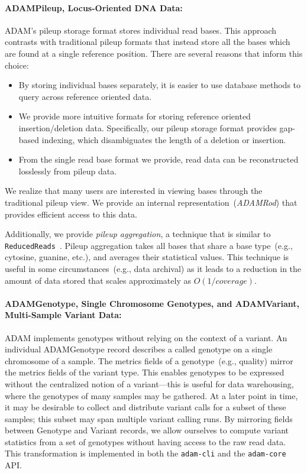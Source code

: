\documentclass{bioinfo}
\begin{document}
\paragraph{ADAMPileup, Locus-Oriented DNA Data:}
\label{sec:adampileup}

ADAM's pileup storage format stores individual read bases. This approach contrasts with traditional pileup formats that instead store all the bases which are found at a single
reference position. There are several reasons that inform this choice:

\begin{itemize}
\item By storing individual bases separately, it is easier to use database methods to query across reference oriented data.
\item We provide more intuitive formats for storing reference oriented insertion/deletion data. Specifically, our pileup storage format provides gap-based indexing, which
disambiguates the length of a deletion or insertion.
\item From the single read base format we provide, read data can be reconstructed losslessly from pileup data.
\end{itemize}

We realize that many users are interested in viewing bases through the traditional pileup view. We provide an internal representation~(\textit{ADAMRod}) that provides
efficient access to this data.

Additionally, we provide \emph{pileup aggregation}, a technique that is similar to \texttt{ReducedReads}~\citep[see][]{mckenna10}. Pileup aggregation takes all bases that
share a base type~(e.g., cytosine, guanine, etc.), and averages their statistical values. This technique is useful in some circumstances~(e.g., data archival) as it leads to a
reduction in the amount of data stored that scales approximately as $O(1/coverage)$.

\paragraph{ADAMGenotype, Single Chromosome Genotypes, and ADAMVariant, Multi-Sample Variant Data:}
\label{sec:adamvariant}

ADAM implements genotypes without relying on the context of a variant. An individual ADAMGenotype record describes a called genotype on a single chromosome of a
sample. The metrics fields of a genotype~(e.g., quality) mirror the metrics fields of the variant type. This enables genotypes to be expressed without the centralized notion
of a variant---this is useful for data warehousing, where the genotypes of many samples may be gathered. At a later point in time, it may be desirable to collect and distribute
variant calls for a subset of these samples; this subset may span multiple variant calling runs. By mirroring fields between Genotype and Variant records, we allow ourselves
to compute variant statistics from a set of genotypes without having access to the raw read data. This transformation is implemented in both the \texttt{adam-cli} and the
\texttt{adam-core} API.
\end{document}
